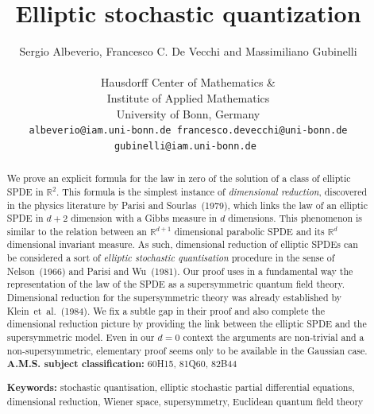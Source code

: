 \documentclass[a4paper,10pt]{article}
\newcommand{\tmsep}{, }
\newcommand{\tmtextit}[1]{{\itshape{#1}}}
\newcommand{\tmkeywords}{\textbf{Keywords:} }
\newcommand{\tmmsc}{\textbf{A.M.S. subject classification:} }
\begin{document}
\title{Elliptic stochastic quantization}

\author{
  Sergio Albeverio, Francesco C. De Vecchi and Massimiliano Gubinelli  \\[1em]
  \begin{minipage}{8cm}\small\centering
  {Hausdorff Center of Mathematics \& \\
  Institute of Applied Mathematics\\
  University of Bonn, Germany}\\[.3em]
  \tt{albeverio@iam.uni-bonn.de}
  \tt{francesco.devecchi@uni-bonn.de}
  \tt{gubinelli@iam.uni-bonn.de}
  \end{minipage}
}


\maketitle

\begin{abstract}
\vspace{.3em}We prove an explicit formula for the law in zero of the solution of a class
  of elliptic SPDE in $\mathbb{R}^2$. This formula is the simplest instance of
  \tmtextit{dimensional reduction}, discovered in the physics literature by
  Parisi and Sourlas~(1979), which links the law of an elliptic SPDE in $d +
  2$ dimension with a Gibbs measure in $d$ dimensions. This phenomenon is
  similar to the relation between an $\mathbb{R}^{d + 1}$ dimensional
  parabolic SPDE and its $\mathbb{R}^d$ dimensional invariant measure. As
  such, dimensional reduction of elliptic SPDEs can be considered a sort of
  \tmtextit{elliptic stochastic quantisation} procedure in the sense of
  Nelson~(1966) and Parisi and Wu~(1981). Our proof uses in a fundamental way
  the representation of the law of the SPDE as a supersymmetric quantum field
  theory. Dimensional reduction for the supersymmetric theory was already
  established by Klein~et~al.~(1984). We fix a subtle gap in their proof and
  also complete the dimensional reduction picture by providing the link
  between the elliptic SPDE and the supersymmetric model. Even in our $d = 0$
  context the arguments are non-trivial and a non-supersymmetric, elementary
  proof seems only to be available in the Gaussian case.\\[.3em]
  
\noindent\tmmsc{60H15}{\tmsep}{81Q60}{\tmsep}{82B44}

\noindent\tmkeywords{stochastic quantisation}{\tmsep}{elliptic stochastic partial
differential equations}{\tmsep}{dimensional reduction}{\tmsep}{Wiener
space}{\tmsep}{supersymmetry}{\tmsep}{Euclidean quantum field theory }
\end{abstract}
\end{document}
